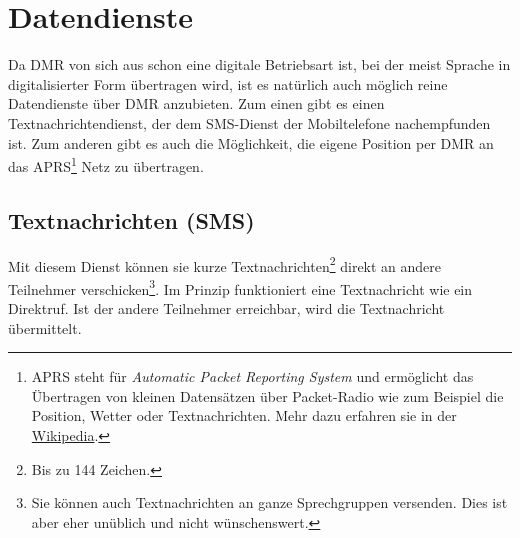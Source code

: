 \section{Datendienste} \label{sec:data}
Da DMR von sich aus schon eine digitale Betriebsart ist, bei der meist Sprache in digitalisierter 
Form übertragen wird, ist es natürlich auch möglich reine Datendienste über DMR anzubieten. Zum 
einen gibt es einen Textnachrichtendienst, der dem SMS-Dienst der Mobiltelefone nachempfunden ist. 
Zum anderen gibt es auch die Möglichkeit, die eigene Position per DMR an das APRS\footnote{APRS 
steht für \emph{Automatic Packet Reporting System} und ermöglicht das Übertragen von kleinen 
Datensätzen über Packet-Radio wie zum Beispiel die Position, Wetter oder Textnachrichten. Mehr 
dazu erfahren sie in der \href{https://de.wikipedia.org/wiki/Automatic_Packet_Reporting_System}{Wikipedia}.} 
Netz zu übertragen.
 
\subsection{Textnachrichten (SMS)} \label{sec:textmsg}
Mit diesem Dienst können sie kurze Textnachrichten\footnote{Bis zu 144 Zeichen.} direkt an andere Teilnehmer verschicken\footnote{Sie können auch Textnachrichten an ganze Sprechgruppen versenden. Dies ist aber eher unüblich und nicht wünschenswert.}. Im Prinzip funktioniert eine Textnachricht wie ein Direktruf. Ist der andere Teilnehmer erreichbar, wird die Textnachricht übermittelt. 

